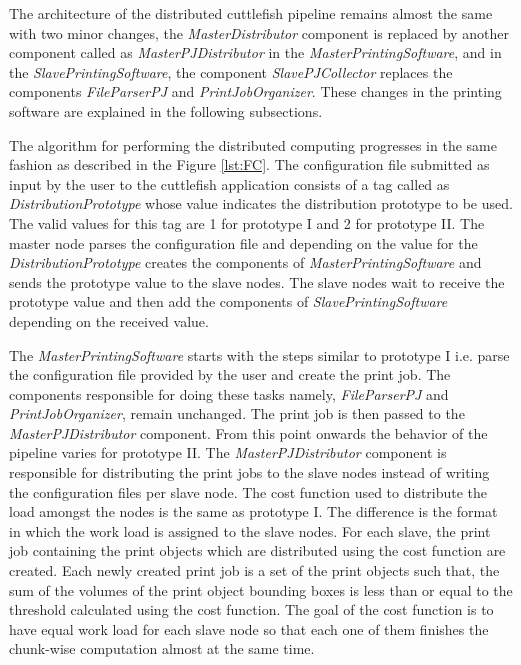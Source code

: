 The architecture of the distributed cuttlefish pipeline remains almost the same with two minor changes, the \textit{MasterDistributor} component is replaced by another component called as \textit{MasterPJDistributor} in the \textit{MasterPrintingSoftware}, and in the \textit{SlavePrintingSoftware}, the component \textit{SlavePJCollector} replaces the components \textit{FileParserPJ} and \textit{PrintJobOrganizer}. These changes in the printing software are explained in the following subsections. \newline 

The algorithm for performing the distributed computing progresses in the same fashion as described in the Figure \ref{lst:FC}. The configuration file submitted as input by the user to the cuttlefish application consists of a tag called as \textit{DistributionPrototype} whose value indicates the distribution prototype to be used. The valid values for this tag are 1 for prototype I and 2 for prototype II. The master node parses the configuration file and depending on the value for the \textit{DistributionPrototype} creates the components of \textit{MasterPrintingSoftware} and sends the prototype value to the slave nodes. The slave nodes wait to receive the prototype value and then add the components of \textit{SlavePrintingSoftware} depending on the received value. \newline

The \textit{MasterPrintingSoftware} starts with the steps similar to prototype I i.e. parse the configuration file provided by the user and create the print job. The components responsible for doing these tasks namely, \textit{FileParserPJ} and \textit{PrintJobOrganizer}, remain unchanged. The print job is then passed to the \textit{MasterPJDistributor} component. From this point onwards the behavior of the pipeline varies for prototype II. The \textit{MasterPJDistributor} component is responsible for distributing the print jobs to the slave nodes instead of writing the configuration files per slave node. The cost function used to distribute the load amongst the nodes is the same as prototype I. The difference is the format in which the work load is assigned to the slave nodes. For each slave, the print job containing the print objects which are distributed using the cost function are created. Each newly created print job is a set of the print objects such that, the sum of the volumes of the print object bounding boxes is less than or equal to the threshold calculated using the cost function. The goal of the cost function is to have equal work load for each slave node so that each one of them finishes the chunk-wise computation almost at the same time. \newline




